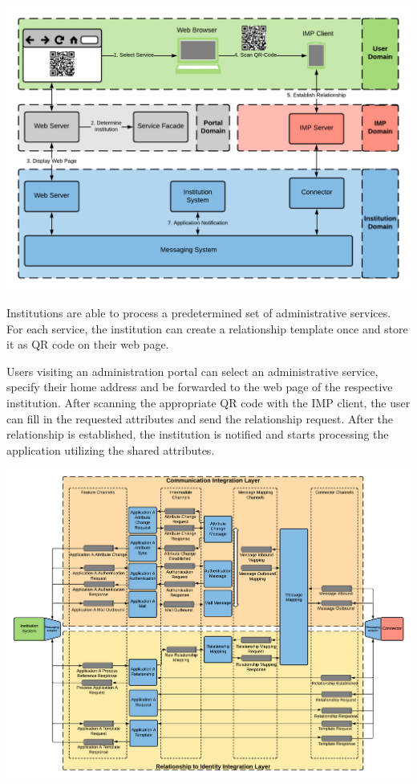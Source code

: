\begin{center}
    \includegraphics[scale=0.6]{Diagrams/Integration Architecture 2/Technological Integration/3. Application Overview.pdf}
\end{center}

Institutions are able to process a predetermined set of administrative services. For each service, the institution can create a relationship template once and store it as QR code on their web page. 

Users visiting an administration portal can select an administrative service, specify their home address and be forwarded to the web page of the respective institution. After scanning the appropriate QR code with the IMP client, the user can fill in the requested attributes and send the relationship request. After the relationship is established, the institution is notified and starts processing the application utilizing the shared attributes.

\begin{center}
    \includegraphics[scale=0.5]{Diagrams/Integration Architecture 2/Technological Integration/2. Messaging Overview.pdf}
\end{center}


